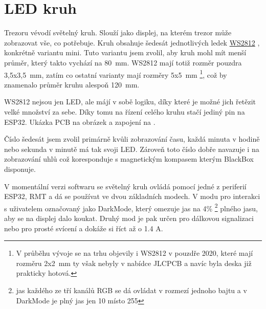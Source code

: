 \section{LED kruh}
\label{WS2812}

Trezoru vévodí světelný kruh. Slouží jako displej, na kterém trezor může zobrazovat vše, co potřebuje. Kruh obsahuje šedesát jednotlivých ledek 
\href{https://cdn-shop.adafruit.com/datasheets/WS2812B.pdf}{WS2812} \parencite{WS2812}, konkrétně variantu mini. Tuto variantu jsem zvolil, aby kruh mohl mít menší
průměr, který takto vychází na 80~mm. WS2812 mají totiž rozměr pouzdra 3,5x3,5~mm, zatím co ostatní varianty mají rozměry 5x5~mm \footnote{V průběhu vývoje se na trhu 
objevily i WS2812 v pouzdře 2020, které mají rozměru 2x2~mm ty však nebyly v nabídce JLCPCB a navíc byla deska již prakticky hotová.}, což by znamenalo průměr kruhu alespoň 120~mm.

WS2812 nejsou jen LED, ale májí v sobě logiku, díky které je možné jich řetězit velké množství za sebe. Díky tomu na řízení celého kruhu stačí jediný pin na ESP32.\newline
Ukázka PCB na obrázek  a zapojení na .

Číslo šedesát jsem zvolil primárně kvůli zobrazování času, každá minuta v hodině nebo sekunda v minutě má tak svoji LED.
Zároveň toto číslo dobře navazuje i na zobrazování uhlů což koresponduje s magnetickým kompasem kterým BlackBox disponuje.

V momentální verzi softwaru se světelný kruh ovládá pomocí jedné z periferií ESP32, RMT a dá se používat ve dvou základních modech. 
V modu pro interakci s uživatelem označovaný jako DarkMode, který omezuje jas na 4\% \footnote{jas každého ze tří kanálů RGB 
se dá ovládat v rozmezí jednoho bajtu a v DarkMode je plný jas jen 10 místo 255} plného jasu, aby se na displej dalo koukat. 
Druhý mod je pak určen pro dálkovou signalizaci nebo pro prosté svícení a dokáže si říct až o 1.4 A.